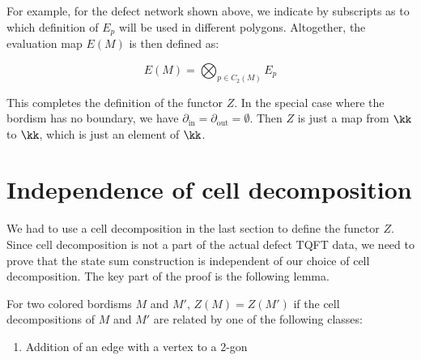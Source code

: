 \begin{defectfiguresetup}
For example, for the defect network shown above, we indicate by subscripts as to which definition of $E_p$ will be used in different polygons. Altogether, the evaluation map $E(M)$ is then defined as:

\begin{equation}
	E(M) = \bigotimes_{p \in C_2(M)} E_p
\end{equation}

This completes the definition of the functor $Z$. In the special case where the bordism has no boundary, we have $\partial_{\mathrm{in}} = \partial_{\mathrm{out}} = \emptyset$. Then $Z$ is just a map from $\kk$ to $\kk$, which is just an element of $\kk$.

\section{Independence of cell decomposition}\label{s:decomposition-independence}
We had to use a cell decomposition in the last section to define the functor $Z$. Since cell decomposition is not a part of the actual defect TQFT data, we need to prove that the state sum construction is independent of our choice of cell decomposition. The key part of the proof is the following lemma.

\begin{lemma}\label{l:invariance-under-local-moves}
	For two colored bordisms $M$ and $M'$, $Z(M) = Z(M')$ if the cell decompositions of $M$ and $M'$ are related by one of the following classes:
	\begin{enumerate}
		\item Addition of an edge with a vertex to a 2-gon

		\newcommand{\twogonA}{%
			\vcenter{\hbox{%
					\begin{tikzpicture}[scale=0.20]
						\begin{pgfonlayer}{nodelayer}
							\node [0cell] (left) at (-4, 0) {};
							\node [0cell] (right) at (5, 0) {};
							\node [style=none] (bottom) at (0.25, -2.85) {};
							\node [style=none] (top) at (0.5, 2.85) {};
						\end{pgfonlayer}
						\begin{pgfonlayer}{edgelayer}
							\draw [1cell, bend left=60, looseness=1.25] (left.center) to (right.center);
							\draw [1cell, bend right=60, looseness=1.25] (left.center) to (right.center);
							\draw [midarrow=0.75, defect, bend right=15] (bottom.center) to (top.center);
						\end{pgfonlayer}
					\end{tikzpicture}%
			}}%
		}


\end{enumerate}
\end{lemma}
\end{defectfiguresetup}
